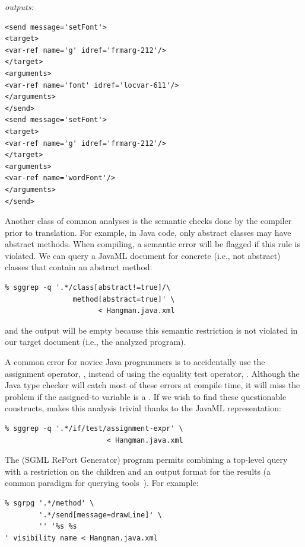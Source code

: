 \documentclass{article}
\begin{document}
\begin{multicols}{2}
\noindent\emph{outputs:}
{\small
\begin{verbatim}
<send message='setFont'>
<target>
<var-ref name='g' idref='frmarg-212'/>
</target>
<arguments>
<var-ref name='font' idref='locvar-611'/>
</arguments>
</send>
<send message='setFont'>
<target>
<var-ref name='g' idref='frmarg-212'/>
</target>
<arguments>
<var-ref name='wordFont'/>
</arguments>
</send>
\end{verbatim}
}

Another class of common analyses is the semantic checks done by the
compiler prior to translation.  For example, in Java code, only abstract
classes may have abstract methods.  When compiling, a semantic error
will be flagged if this rule is violated.  We can query a JavaML document
for concrete (i.e., not abstract) classes that contain an abstract method:

{\small
\begin{verbatim}
% sggrep -q '.*/class[abstract!=true]/\
                method[abstract=true]' \
                      < Hangman.java.xml
\end{verbatim}
}

\noindent and the output will be empty because this semantic restriction is not
violated in our target document (i.e., the analyzed program).

A common error for novice Java programmers is to accidentally use the
assignment operator, \smtexttt{=}, instead of using the equality test
operator, \smtexttt{==}.  Although the Java type checker will catch
most of these errors at compile time, it will miss the problem if
the assigned-to variable is a \smtexttt{boolean}. If we wish to find these
questionable constructs, \smtexttt{sggrep} makes this analysis
trivial thanks to the JavaML representation:

{\small
\begin{verbatim}
% sggrep -q '.*/if/test/assignment-expr' \
                        < Hangman.java.xml
\end{verbatim}
}

The  (SGML RePort Generator) program permits combining a
top-level query with a restriction on the children and an output format
for the results (a common paradigm for querying tools~\cite{XMLQL-EnE}).
For example:

{\small
\begin{verbatim}
% sgrpg '.*/method' \
        '.*/send[message=drawLine]' \
        '' '%s %s 
' visibility name < Hangman.java.xml
\end{verbatim}

}
\end{multicols}
\end{document}
